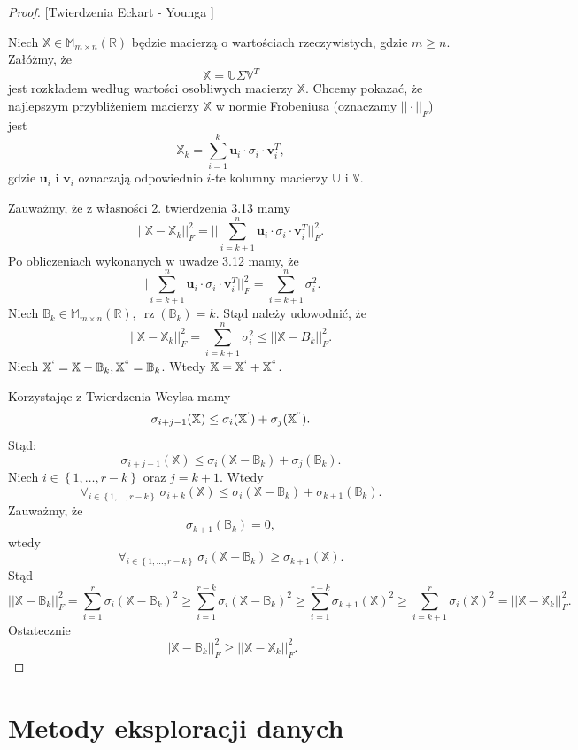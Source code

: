 \documentclass[12pt,a4paper]{report}
\newcommand{\set}[1]{\left\lbrace {#1} \right\rbrace}
\newcommand{\setR}{\mathbb{R}}
\newcommand{\rz}[1]{\operatorname{rz}\left({#1} \right)}
\begin{document}
\begin{proof}{[Twierdzenia Eckart - Younga {\citep[Tw. 4.21]{tsvdalra}}]} 

Niech $\mathbb{X} \in \mathbb{M}_{m\times n}(\setR)$ będzie macierzą o wartościach rzeczywistych, gdzie $m \geqslant n$.
Załóżmy, że
$$
\mathbb{X}=\mathbb{U} \Sigma \mathbb{V}^T
$$
jest rozkładem według wartości osobliwych macierzy $\mathbb{X}$.
Chcemy pokazać, że najlepszym przybliżeniem macierzy $\mathbb{X}$ w normie Frobeniusa (oznaczamy $||\cdot||_F$) jest
$$
\mathbb{X}_k = \sum_{i=1}^k \mathbf{u}_i\cdot \sigma_i \cdot \mathbf{v}_i^T,
$$
gdzie $\mathbf{u}_i$ i $\mathbf{v}_i$ oznaczają odpowiednio $i$-te kolumny macierzy $\mathbb{U}$ i $\mathbb{V}$.

Zauważmy, że z własności 2. twierdzenia 3.13 mamy
$$
||\mathbb{X} - \mathbb{X}_k||_F^2 = ||\sum_{i=k+1}^n \mathbf{u}_i \cdot \sigma_i \cdot \mathbf{v}_i^T||_F^2.
$$
Po obliczeniach wykonanych w uwadze 3.12 mamy, że
$$
||\sum_{i=k+1}^n \mathbf{u}_i \cdot \sigma_i \cdot \mathbf{v}_i^T||_F^2 =\sum_{i=k+1}^n \sigma_i^2.
$$
Niech $\mathbb{B}_k \in \mathbb{M}_{m \times n}(\setR), \: \rz{\mathbb{B}_k} = k$. 
Stąd należy udowodnić, że
$$
||\mathbb{X} - \mathbb{X}_k||_F^2 = \sum_{i=k+1}^n \sigma_i^2 \leqslant ||\mathbb{X} - B_k||_F^2.
$$
Niech $\mathbb{X}^{`} = \mathbb{X}-\mathbb{B}_k, \mathbb{X}^{``} = \mathbb{B}_k$.
Wtedy $\mathbb{X} = \mathbb{X}^{`} + \mathbb{X}^{``}$. 

Korzystając z Twierdzenia Weylsa mamy
$$
\sigma_{i+j-1}(\mathbb{X})\leq \sigma_{i}(\mathbb{X}^{`}) + \sigma_j(\mathbb{X}^{``}).
$$ 
Stąd:
$$
\sigma_{i+j-1}(\mathbb{X})\leq \sigma_{i}(\mathbb{X} - \mathbb{B}_k) + \sigma_j(\mathbb{B}_k).
$$ 
Niech $i \in \set{1, \ldots, r-k}$ oraz $j= k+1$. Wtedy
$$
\forall_{i \in \set{1, \ldots, r-k}} \: \sigma_{i+k}(\mathbb{X})\leq \sigma_{i}(\mathbb{X} - \mathbb{B}_k) + \sigma_{k+1}(\mathbb{B}_k).
$$ 
Zauważmy, że
$$
\sigma_{k+1}(\mathbb{B}_k)=0,
$$
wtedy
$$
\forall_{i \in \set{1, \ldots, r-k}} \: \sigma_i(\mathbb{X}-\mathbb{B}_k)\geq \sigma_{k+1}(\mathbb{X}).
$$
Stąd
$$
||\mathbb{X} - \mathbb{B}_k||_F^2 = \sum_{i=1}^r \sigma_i(\mathbb{X}-\mathbb{B}_k)^2 \geq \sum_{i=1}^{r-k} \sigma_i(\mathbb{X}-\mathbb{B}_k)^2 \geq \sum_{i=1}^{r-k} \sigma_{k+1}(\mathbb{X})^2 \geq \sum_{i = k+1}^r \sigma_i(\mathbb{X})^2 = ||\mathbb{X}-\mathbb{X}_k||_F^2 .
$$
Ostatecznie
$$
||\mathbb{X} - \mathbb{B}_k||_F^2 \geqslant ||\mathbb{X}-\mathbb{X}_k||_F^2.
$$
\end{proof}


\section{Metody eksploracji danych}
\end{document}
